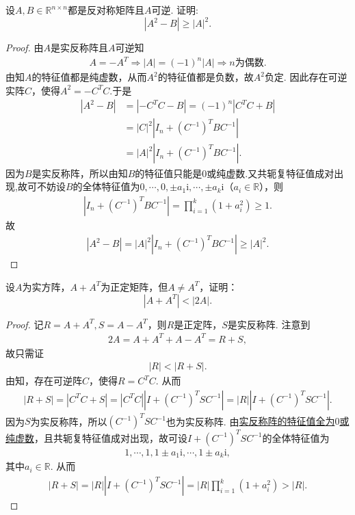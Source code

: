 \documentclass[../../main.tex]{subfiles}%
\begin{document}
\begin{example}
设$A,B \in \mathbb{R}^{n \times n}$都是反对称矩阵且$A$可逆. 证明:
$$|A^2 - B| \geqslant |A|^2.$$
\end{example}
\begin{proof}

由$A$是实反称阵且$A$可逆知
\begin{align*}
A=-A^T\Longrightarrow |A|=(-1)^n|A|\Longrightarrow n\text{为偶数}.
\end{align*}
由知$A$的特征值都是纯虚数，从而$A^2$的特征值都是负数，故$A^2$负定.
因此存在可逆实阵$C$，使得$A^2=-C^TC$.于是
\begin{align*}
|A^2-B|&=|-C^TC-B|=(-1)^n|C^TC+B|\\
&=|C|^2|I_n+(C^{-1})^TBC^{-1}|\\
&=|A|^2|I_n+(C^{-1})^TBC^{-1}|.
\end{align*}
因为$B$是实反称阵，所以由知$B$的特征值只能是$0$或纯虚数.又共轭复特征值成对出现,故可不妨设$B$的全体特征值为$0,\cdots,0,\pm a_1\mathrm{i},\cdots,\pm a_k\mathrm{i}$（$a_i\in\mathbb{R}$），则
\begin{align*}
|I_n+(C^{-1})^TBC^{-1}|=\prod_{i=1}^k(1+a_i^2)\geqslant1.
\end{align*}
故
\begin{align*}
|A^2-B|=|A|^2|I_n+(C^{-1})^TBC^{-1}|\geqslant|A|^2.
\end{align*}
\end{proof}

\begin{example}
设$A$为实方阵，$A + A^T$为正定矩阵，但$A \ne A^T$，证明：
$$|A + A^T| < |2A|.$$
\end{example}
\begin{proof}

记$R=A+A^T,S=A-A^T$，则$R$是正定阵，$S$是实反称阵. 注意到
\begin{align*}
2A=A+A^T+A-A^T=R+S,
\end{align*}
故只需证
\begin{align*}
|R|<|R+S|.
\end{align*}
由知，存在可逆阵$C$，使得$R=C^TC$. 从而
\begin{align*}
|R+S|=|C^TC+S|=|C^TC||I+(C^{-1})^TSC^{-1}|=|R||I+(C^{-1})^TSC^{-1}|.
\end{align*}
因为$S$为实反称阵，所以$(C^{-1})^TSC^{-1}$也为实反称阵. 由\hyperref[proposition:实对称(反称)阵的特征值]{实反称阵的特征值全为$0$或纯虚数}，且共轭复特征值成对出现，故可设$I+(C^{-1})^TSC^{-1}$的全体特征值为
\begin{align*}
1,\cdots,1,1\pm a_1\mathrm{i},\cdots,1\pm a_k\mathrm{i},
\end{align*}
其中$a_i\in\mathbb{R}$. 从而
\begin{align*}
|R+S|=|R||I+(C^{-1})^TSC^{-1}|=|R|\prod_{i=1}^k(1+a_i^2)>|R|.
\end{align*}

\end{proof}
\end{document}
